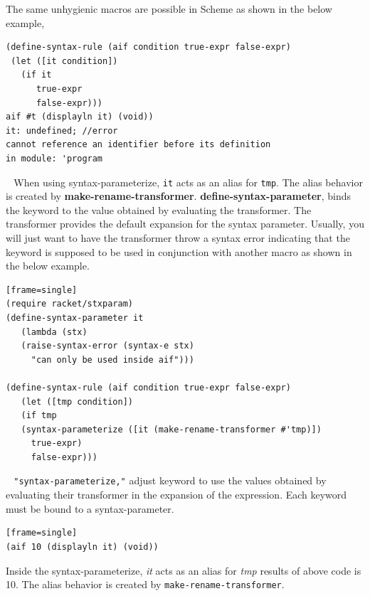 The same unhygienic macros are possible in Scheme as shown in the below example, 
\begin{lstlisting}[frame=single]
(define-syntax-rule (aif condition true-expr false-expr)
 (let ([it condition])
   (if it
      true-expr
      false-expr)))
aif #t (displayln it) (void))
it: undefined; //error
cannot reference an identifier before its definition
in module: 'program
\end{lstlisting}
\textcolor{white}{``}
When using syntax-parameterize, \texttt{it} acts as an alias for \texttt{tmp}. The alias behavior is created by \textbf{make-rename-transformer}. \textbf{define-syntax-parameter}, binds the keyword to the value obtained by evaluating the transformer. The transformer provides the default expansion for the syntax parameter. Usually, you will just want to have the transformer throw a syntax error indicating that the keyword is supposed to be used in conjunction with another macro as shown in the below example. 
\textcolor{white}{''}
\begin{lstlisting}[frame=single][frame=single]
(require racket/stxparam)
(define-syntax-parameter it
   (lambda (stx)
   (raise-syntax-error (syntax-e stx)
     "can only be used inside aif")))

(define-syntax-rule (aif condition true-expr false-expr)
   (let ([tmp condition])
   (if tmp
   (syntax-parameterize ([it (make-rename-transformer #'tmp)])
     true-expr)
     false-expr)))
\end{lstlisting}
\textcolor{white}{``}
\texttt{"syntax-parameterize,"} adjust keyword to use the values obtained by evaluating their transformer in the expansion of the expression. Each keyword must be bound to a syntax-parameter.
\textcolor{white}{''}
\begin{lstlisting}[frame=single][frame=single]
(aif 10 (displayln it) (void))
\end{lstlisting}
Inside the syntax-parameterize, \textit{it} acts as an alias for \textit{tmp} results of above code is 10. The alias behavior is created by \texttt{make-rename-transformer}.